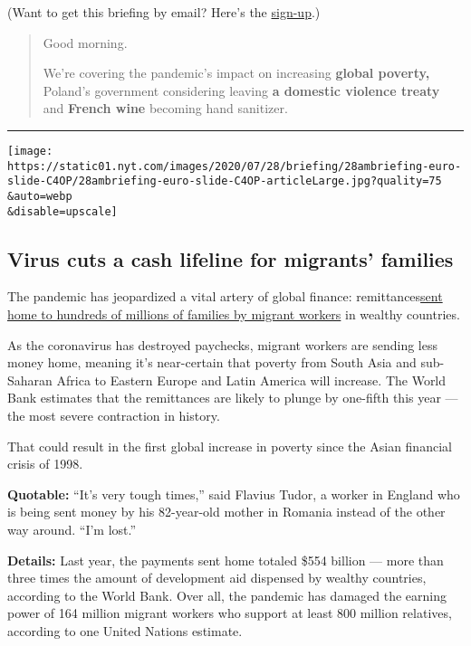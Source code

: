(Want to get this briefing by email? Here's the
\href{https://www.nytimes.com/morning-briefing}{sign-up}.)

\begin{quote}
Good morning.

We're covering the pandemic's impact on increasing \textbf{global
poverty,} Poland's government considering leaving \textbf{a domestic
violence treaty} and \textbf{French wine} becoming hand sanitizer.
\end{quote}

\begin{center}\rule{0.5\linewidth}{\linethickness}\end{center}

\texttt{[image: https://static01.nyt.com/images/2020/07/28/briefing/28ambriefing-euro-slide-C4OP/28ambriefing-euro-slide-C4OP-articleLarge.jpg?quality=75\\\&auto=webp\\\&disable=upscale]}

\hypertarget{virus-cuts-a-cash-lifeline-for-migrants-families}{%
\subsection{Virus cuts a cash lifeline for migrants'
families}\label{virus-cuts-a-cash-lifeline-for-migrants-families}}

The pandemic has jeopardized a vital artery of global finance:
remittances\href{https://www.nytimes.com/2020/07/27/business/global-remittances-coronavirus.html}{sent
home to hundreds of millions of families by migrant workers} in wealthy
countries.

As the coronavirus has destroyed paychecks, migrant workers are sending
less money home, meaning it's near-certain that poverty from South Asia
and sub-Saharan Africa to Eastern Europe and Latin America will
increase. The World Bank estimates that the remittances are likely to
plunge by one-fifth this year --- the most severe contraction in
history.

That could result in the first global increase in poverty since the
Asian financial crisis of 1998.

\textbf{Quotable:} ``It's very tough times,'' said Flavius Tudor, a
worker in England who is being sent money by his 82-year-old mother in
Romania instead of the other way around. ``I'm lost.''

\textbf{Details:} Last year, the payments sent home totaled \$554
billion --- more than three times the amount of development aid
dispensed by wealthy countries, according to the World Bank. Over all,
the pandemic has damaged the earning power of 164 million migrant
workers who support at least 800 million relatives, according to one
United Nations estimate.

